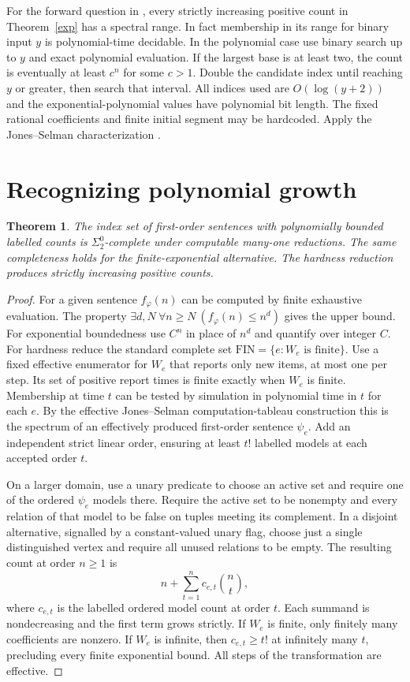 \documentclass[11pt]{article}
\newtheorem{theorem}{Theorem}
\begin{document}
For the forward question in \cite{djmm}, every strictly increasing positive count in Theorem~\ref{exp} has a spectral range. In fact membership in its range for binary input $y$ is polynomial-time decidable. In the polynomial case use binary search up to $y$ and exact polynomial evaluation. If the largest base is at least two, the count is eventually at least $c^n$ for some $c>1$. Double the candidate index until reaching $y$ or greater, then search that interval. All indices used are $O(\log(y+2))$ and the exponential-polynomial values have polynomial bit length. The fixed rational coefficients and finite initial segment may be hardcoded. Apply the Jones--Selman characterization \cite{js}.

\section{Recognizing polynomial growth}
\begin{theorem}
The index set of first-order sentences with polynomially bounded labelled counts is $\Sigma^0_2$-complete under computable many-one reductions. The same completeness holds for the finite-exponential alternative. The hardness reduction produces strictly increasing positive counts.
\end{theorem}
\begin{proof}
For a given sentence $f_\varphi(n)$ can be computed by finite exhaustive evaluation. The property $\exists d,N\ \forall n\ge N\ (f_\varphi(n)\le n^d)$ gives the upper bound. For exponential boundedness use $C^n$ in place of $n^d$ and quantify over integer $C$. For hardness reduce the standard complete set $\mathrm{FIN}=\{e:W_e\text{ is finite}\}$. Use a fixed effective enumerator for $W_e$ that reports only new items, at most one per step. Its set of positive report times is finite exactly when $W_e$ is finite. Membership at time $t$ can be tested by simulation in polynomial time in $t$ for each $e$. By the effective Jones--Selman computation-tableau construction this is the spectrum of an effectively produced first-order sentence $\psi_e$. Add an independent strict linear order, ensuring at least $t!$ labelled models at each accepted order $t$.

On a larger domain, use a unary predicate to choose an active set and require one of the ordered $\psi_e$ models there. Require the active set to be nonempty and every relation of that model to be false on tuples meeting its complement. In a disjoint alternative, signalled by a constant-valued unary flag, choose just a single distinguished vertex and require all unused relations to be empty. The resulting count at order $n\ge1$ is
\[
                       n+\sum_{t=1}^n c_{e,t}\binom nt ,
\]
where $c_{e,t}$ is the labelled ordered model count at order $t$. Each summand is nondecreasing and the first term grows strictly. If $W_e$ is finite, only finitely many coefficients are nonzero. If $W_e$ is infinite, then $c_{e,t}\ge t!$ at infinitely many $t$, precluding every finite exponential bound. All steps of the transformation are effective.
\end{proof}
\end{document}
